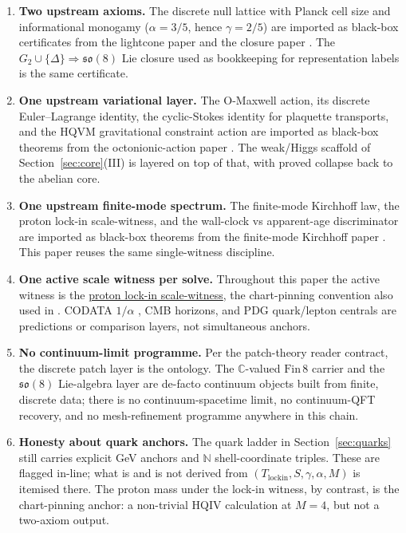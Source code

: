 \documentclass[11pt]{article}
\begin{document}
\begin{enumerate}[leftmargin=2em]
\item \textbf{Two upstream axioms.} The discrete null lattice
  with Planck cell size and informational monogamy
  ($\alpha=3/5$, hence $\gamma=2/5$) are imported as black-box
  certificates from the lightcone paper
  \cite{hqiv-lightcone-paper} and the closure paper
  \cite{hqiv-so8-paper}. The
  $G_2\cup\{\Delta\}\Rightarrow\mathfrak{so}(8)$ Lie closure
  used as bookkeeping for representation labels is the same
  certificate.
\item \textbf{One upstream variational layer.} The O-Maxwell
  action, its discrete Euler--Lagrange identity, the
  cyclic-Stokes identity for plaquette transports, and the
  HQVM gravitational constraint action are imported as
  black-box theorems from the octonionic-action paper
  \cite{hqiv-oct-action-paper}. The weak/Higgs scaffold of
  Section~\ref{sec:core}(III) is layered on top of that, with
  proved collapse back to the abelian core.
\item \textbf{One upstream finite-mode spectrum.} The
  finite-mode Kirchhoff law, the proton lock-in scale-witness,
  and the wall-clock vs apparent-age discriminator are
  imported as black-box theorems from the finite-mode
  Kirchhoff paper \cite{hqiv-kirchhoff-paper}. This paper
  reuses the same single-witness discipline.
\item \textbf{One active scale witness per solve.} Throughout
  this paper the active witness is the
  \hyperref[lean:proton-lockin]{proton lock-in scale-witness},
  the chart-pinning convention also used in
  \cite{hqiv-kirchhoff-paper}. CODATA $1/\alpha$
  \cite{codata2018}, CMB horizons, and PDG quark/lepton
  centrals \cite{pdg2024} are predictions or comparison
  layers, not simultaneous anchors.
\item \textbf{No continuum-limit programme.} Per the
  patch-theory reader contract, the discrete patch layer is
  the ontology. The $\mathbb{C}$-valued
  $\mathrm{Fin}\,8$ carrier and the $\mathfrak{so}(8)$
  Lie-algebra layer are de-facto continuum objects built from
  finite, discrete data; there is no continuum-spacetime
  limit, no continuum-QFT recovery, and no mesh-refinement
  programme anywhere in this chain.
\item \textbf{Honesty about quark anchors.} The quark ladder
  in Section~\ref{sec:quarks} still carries explicit GeV
  anchors and $\mathbb{N}$ shell-coordinate triples. These
  are flagged in-line; what is and is not derived from
  $(T_{\mathrm{lockin}},S,\gamma,\alpha,M)$ is itemised
  there. The proton mass under the lock-in witness, by
  contrast, is the chart-pinning anchor: a non-trivial
  HQIV calculation at $M=4$, but not a two-axiom output.
\end{enumerate}
\end{document}
